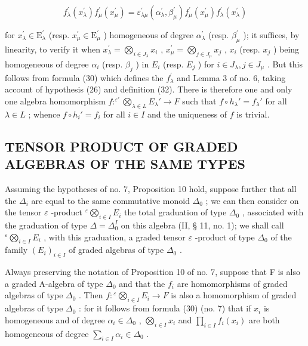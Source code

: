 \[
f _ {\lambda} ^ {\prime} (x _ {\lambda} ^ {\prime}) f _ {\mu} ^ {\prime} (x _ {\mu} ^ {\prime}) = \varepsilon_ {\lambda \mu} ^ {\prime} (\alpha_ {\lambda} ^ {\prime}, \beta_ {\mu} ^ {\prime}) f _ {\mu} ^ {\prime} (x _ {\mu} ^ {\prime}) f _ {\lambda} ^ {\prime} (x _ {\lambda} ^ {\prime})\tag{34}
\]

for \(x_{\lambda}^{\prime} \in \mathrm{E}_{\lambda}^{\prime}\) (resp. \(x_{\mu}^{\prime} \in \mathrm{E}_{\mu}^{\prime}\) ) homogeneous of degree \(\alpha_{\lambda}^{\prime}\) (resp. \(\beta_{\mu}^{\prime}\) ); it suffices, by linearity, to verify it when \(x_{\lambda}^{\prime} = \bigotimes_{i \in J_{\lambda}} x_{i}\) , \(x_{\mu}^{\prime} = \bigotimes_{j \in J_{\mu}} x_{j}\) , \(x_{i}\) (resp. \(x_{j}\) ) being homogeneous of degree \(\alpha_{i}\) (resp. \(\beta_{j}\) ) in \(E_{i}\) (resp. \(E_{j}\) ) for \(i \in J_{\lambda}, j \in J_{\mu}\) . But this follows from formula (30) which defines the \(f_{\lambda}^{\prime}\) and Lemma 3 of no. 6, taking account of hypothesis (26) and definition (32). There is therefore one and only one algebra homomorphism \(f: ^{\varepsilon'} \bigotimes_{\lambda \in L} E_{\lambda}' \to F\) such that \(f \circ h_{\lambda}' = f_{\lambda}'\) for all \(\lambda \in L\) ; whence \(f \circ h_{i}' = f_{i}\) for all \(i \in I\) and the uniqueness of \(f\) is trivial.

\subsection{TENSOR PRODUCT OF GRADED ALGEBRAS OF THE SAME TYPES}

Assuming the hypotheses of no. 7, Proposition 10 hold, suppose further that all the \(\Delta_{i}\) are equal to the same commutative monoid \(\Delta_{0}\) ; we can then consider on the tensor \(\varepsilon\) -product \({}^{\varepsilon}\bigotimes_{i\in I}E_{i}\) the total graduation of type \(\Delta_{0}\) , associated with the graduation of type \(\Delta = \Delta_{0}^{I}\) on this algebra (II, § 11, no. 1); we shall call \({}^{\varepsilon}\bigotimes_{i\in I}E_{i}\) , with this graduation, a graded tensor \(\varepsilon\) -product of type \(\Delta_{0}\) of the family \((E_{i})_{i\in I}\) of graded algebras of type \(\Delta_{0}\) .

Always preserving the notation of Proposition 10 of no. 7, suppose that F is also a graded A-algebra of type \(\Delta_0\) and that the \(f_i\) are homomorphisms of graded algebras of type \(\Delta_0\) . Then \(f: {}^{\varepsilon}\bigotimes_{i \in I} E_i \to F\) is also a homomorphism of graded algebras of type \(\Delta_0\) : for it follows from formula (30) (no. 7) that if \(x_i\) is homogeneous and of degree \(\alpha_i \in \Delta_0\) , \(\bigotimes_{i \in I} x_i\) and \(\prod_{i \in I} f_i(x_i)\) are both homogeneous of degree \(\sum_{i \in I} \alpha_i \in \Delta_0\) .

